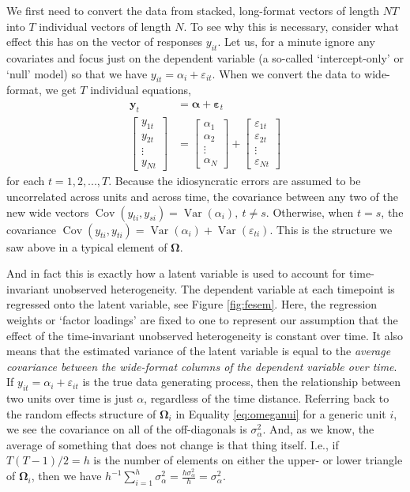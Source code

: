 \documentclass[
  12pt,
  a4paper]{article}
\DeclareMathOperator{\Var}{\mathrm{Var}}
\DeclareMathOperator{\Cov}{\mathrm{Cov}}
\begin{document}
We first need to convert the data from stacked, long-format vectors of
length \(NT\) into \(T\) individual vectors of length \(N\). To see why
this is necessary, consider what effect this has on the vector of
responses \(y_{it}\). Let us, for a minute ignore any covariates and
focus just on the dependent variable (a so-called `intercept-only' or
`null' model) so that we have
\(y_{it} = \alpha_{i} + \varepsilon_{it}\). When we convert the data to
wide-format, we get \(T\) individual equations, \begin{align}
\bm{y}_{t} & = \bm{\alpha} + \bm{\varepsilon}_{t} \\
\begin{bmatrix}
y_{1t} \\
y_{2t} \\
\vdots \\
y_{Nt}\end{bmatrix} & = 
\begin{bmatrix}
\alpha_{1} \\
\alpha_{2} \\
\vdots \\
\alpha_{N}
\end{bmatrix} + 
\begin{bmatrix}
\varepsilon_{1t} \\
\varepsilon_{2t} \\
\vdots \\
\varepsilon_{Nt}
\end{bmatrix} \label{eq:wide}
\end{align} for each \(t = 1, 2, ..., T\). Because the idiosyncratic
errors are assumed to be uncorrelated across units and across time, the
covariance between any two of the new wide vectors
\(\Cov(y_{ti},y_{si}) = \Var(\alpha_{i}), \ t \ne s\). Otherwise, when
\(t = s\), the covariance
\(\Cov(y_{ti},y_{ti}) = \Var(\alpha_{i}) + \Var(\varepsilon_{ti})\).
This is the structure we saw above in a typical element of
\(\bm{\Omega}\).

And in fact this is exactly how a latent variable is used to account for
time-invariant unobserved heterogeneity. The dependent variable at each
timepoint is regressed onto the latent variable, see Figure
\ref{fig:fesem}. Here, the regression weights or `factor loadings' are
fixed to one to represent our assumption that the effect of the
time-invariant unobserved heterogeneity is constant over time. It also
means that the estimated variance of the latent variable is equal to the
\textit{average covariance between the wide-format columns of the dependent variable over time}.
If \(y_{it} = \alpha_{i} + \varepsilon_{it}\) is the true data
generating process, then the relationship between two units over time is
just \(\alpha\), regardless of the time distance. Referring back to the
random effects structure of \(\bm{\Omega}_{i}\) in Equality
\eqref{eq:omeganui} for a generic unit \(i\), we see the covariance on
all of the off-diagonals is \(\sigma^{2}_{\alpha}\). And, as we know,
the average of something that does not change is that thing itself.
I.e., if \(T(T-1)/2 = h\) is the number of elements on either the upper-
or lower triangle of \(\bm{\Omega}_{i}\), then we have
\(h^{-1}\sum_{i=1}^{h}\sigma^{2}_{\alpha} = \frac{h \sigma^{2}_{\alpha}}{h} = \sigma^{2}_{\alpha}\).
\end{document}
